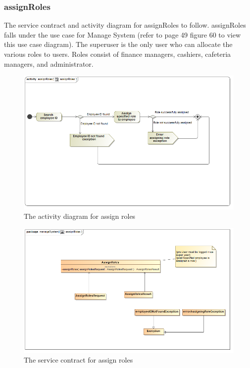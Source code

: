 \documentclass[a4paper,12pt]{report}
\begin{document}
\subsubsection{assignRoles}
The service contract and activity diagram for assignRoles to follow. assignRoles falls under the use case for Manage System (refer to page 49 figure 60 to view this use case diagram). The superuser is the only user who can allocate the various roles to users. Roles consist of finance managers, cashiers, cafeteria managers, and administrator. 
\begin{figure}[H]
  \centering
    \includegraphics[width=1.0\textwidth]{../images/assignRolesActivityDiagram.png}
    \caption{The activity diagram for assign roles} 
\end{figure}

\begin{figure}[H]
	\centering
	\includegraphics[width=1.0\textwidth]{../images/assignRolesServiceContract.png}
	\caption{The service contract for assign roles}
\end{figure}
\end{document}
